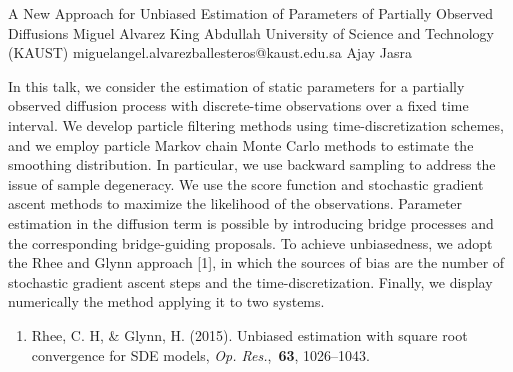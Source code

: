 \begin{talk}
  {A New Approach for Unbiased Estimation of Parameters of Partially Observed Diffusions}%
  {Miguel Alvarez}%
  {King Abdullah University of Science and Technology (KAUST)}%
  {miguelangel.alvarezballesteros@kaust.edu.sa}%
  {Ajay Jasra}%
  
    
   
In this talk, we consider the estimation of static parameters for a partially observed diffusion process with discrete-time observations over a fixed time interval. We develop particle filtering methods using time-discretization schemes, and we employ particle Markov chain Monte Carlo methods to estimate the smoothing distribution. In particular, we use backward sampling to address the issue of sample degeneracy. We use the score function and stochastic gradient ascent methods to maximize the likelihood of the observations. Parameter estimation in the diffusion term is possible by introducing bridge processes and the corresponding bridge-guiding proposals. To achieve unbiasedness, we adopt the Rhee and Glynn approach [1], in which the sources of bias are the number of stochastic gradient ascent steps and the time-discretization. Finally, we display numerically the method applying it to two systems. 

\medskip

\begin{enumerate}
 \item[{[1]}] Rhee, C. H, \& Glynn, H. (2015).  Unbiased estimation with square root convergence for SDE models, \emph{Op. Res.},~{\bf 63}, 1026--1043. 
\end{enumerate}

\end{talk}


